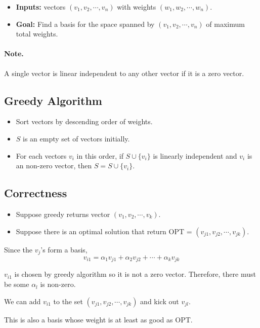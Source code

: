 \begin{itemize}
	\item \textbf{Inputs:} vectors $(v_1, v_2, \cdots, v_n)$ with weights 
$(w_1, w_2, \cdots, w_n)$.
    \item \textbf{Goal:} Find a basis for the space spanned by $(v_1, v_2, \cdots, 
v_n)$ of maximum total weights.
\end{itemize}
\paragraph{Note.} A single vector is linear independent to any other vector if 
it is a zero vector.

\subsection{Greedy Algorithm}
\begin{itemize}
	\item Sort vectors by descending order of weights.
	\item $S$ is an empty set of vectors initially.
	\item For each vectors $v_i$ in this order, if $S \cup \{v_i\}$ is linearly 
independent and $v_i$ is an non-zero vector, then $S = S \cup \{v_i\}$.
\end{itemize}

\subsection{Correctness}
\begin{itemize}
	\item Suppose greedy returns vector $(v_1, v_2, \cdots, v_k)$.
	\item Suppose there is an optimal solution that return OPT = $(v_{j1}, 
v_{j2}, \cdots, v_{jk})     $.
\end{itemize}

Since the $v_j$'s form a basis,
\[v_{i1} = \alpha_1 v_{j1} + \alpha_2 v_{j2} + \cdots + \alpha_k v_{jk}\]

$v_{i1}$ is chosen by greedy algorithm so it is not a zero vector. Therefore, 
there must be some $\alpha_l$ is non-zero.

We can add $v_{i1}$ to the set $(v_{j1}, v_{j2}, \cdots, v_{jk})$ and kick out 
$v_{jl}$.

\begin{claim}{}
	This is also a basis whose weight is at least as good as OPT.
\end{claim}
